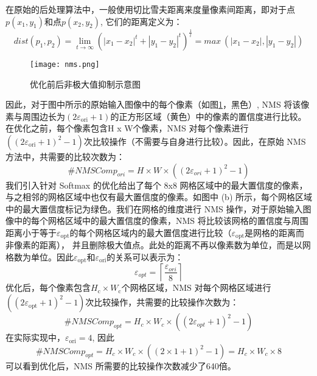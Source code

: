 在原始的后处理算法中，一般使用切比雪夫距离来度量像素间距离，即对于点$p( x_1, y_1)$和点$p(x_2,y_2)$, 它们的距离定义为：
\[dist(p_1,p_2)=\lim_{t\to\infty}(|x_1-x_2|^t+|y_1-y_2|^t)^{\frac1t}=max\:(|x_1-x_2|,|y_1-y_2|)\]
\begin{figure}
  \centering
  \texttt{[image: nms.png]}
  \caption{优化前后非极大值抑制示意图}
  \label{fig_nms}
\end{figure}
因此，对于图中所示的原始输入图像中的每个像素（如图\ref{fig_nms}，黑色）, NMS 将该像素与周围边长为$(2\varepsilon_\mathrm{ori}+1)$的正方形区域（黄色）中的像素的置信度进行比较。在优化之前，每个像素包含H x W个像素，NMS 对每个像素进行$((2\varepsilon_\mathrm{ori}+1)^2-1)$次比较操作（不需要与自身进行比较）。因此，在原始 NMS 方法中，共需要的比较次数为：
\[\#NMSComp_{ori}=H\times W\times((2\varepsilon_{ori}+1)^2-1)\]
我们引入针对 Softmax 的优化给出了每个 8x8 网格区域中的最大置信度的像素， 与之相邻的网格区域中也仅有最大置信度的像素。如图中 (b) 所示，每个网格区域中的最大置信度标记为绿色。我们在网格的维度进行 NMS 操作，对于原始输入图像中的每个网格区域中的最大置信度的像素，NMS 将比较该网格的置信度与周围距离小于等于$\varepsilon_\mathrm{opt}$的每个网格区域内的最大置信度进行比较（$\varepsilon_\mathrm{opt}$是网格的距离而非像素的距离）， 并且删除极大值点。此处的距离不再以像素数为单位，而是以网格数为单位。因此$\varepsilon_\mathrm{opt}$和$\varepsilon_\mathrm{ori}$的关系可以表示为：
\[\varepsilon_{opt}=\left\lceil\frac{\varepsilon_{ori}}{8}\right\rceil\]
优化后，每个像素包含$H_{\mathrm{c}}\times W_{\mathrm{c}}$个网格区域，NMS 对每个网格区域进行$((2\varepsilon_\mathrm{opt}+1)^2-1)$次比较操作，共需要的比较操作次数为：
\[\#NMSComp_{opt}=H_c\times W_c\times\left(\left(2\varepsilon_{opt}+1\right)^2-1\right)\]
在实际实现中，$\varepsilon_{\mathrm{ori}}=4$, 因此
\[\#NMSComp_{opt}=H_c\times W_c\times((2\times1+1)^2-1)=H_c\times W_c\times8\]
可以看到优化后，NMS 所需要的比较操作次数减少了640倍。

